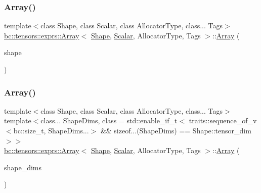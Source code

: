 \mbox{\label{structbc_1_1tensors_1_1exprs_1_1Array_a5fa294dbb5d9eccea7201c507c6f7004}} 
\subsubsection{\texorpdfstring{Array()}{Array()}\hspace{0.1cm}{\footnotesize\ttfamily [6/9]}}
{\footnotesize\ttfamily template$<$class Shape, class Scalar, class Allocator\+Type, class... Tags$>$ \\
\hyperlink{structbc_1_1tensors_1_1exprs_1_1Array}{bc\+::tensors\+::exprs\+::\+Array}$<$ \hyperlink{structbc_1_1Shape}{Shape}, \hyperlink{namespacebc_aa12ac55ee2c43dc082894dd3859daee1}{Scalar}, Allocator\+Type, Tags $>$\+::\hyperlink{structbc_1_1tensors_1_1exprs_1_1Array}{Array} (\begin{DoxyParamCaption}\item[{\hyperlink{structbc_1_1tensors_1_1exprs_1_1Array_a67c96ea64a2899ba0593a6b81aa0868e}{shape\+\_\+type}}]{shape }\end{DoxyParamCaption})\hspace{0.3cm}{\ttfamily [inline]}}

\mbox{\label{structbc_1_1tensors_1_1exprs_1_1Array_a0bdfc60f9711f7334ed0850fd417109c}} 
\subsubsection{\texorpdfstring{Array()}{Array()}\hspace{0.1cm}{\footnotesize\ttfamily [7/9]}}
{\footnotesize\ttfamily template$<$class Shape, class Scalar, class Allocator\+Type, class... Tags$>$ \\
template$<$class... Shape\+Dims, class  = std\+::enable\+\_\+if\+\_\+t$<$			traits\+::sequence\+\_\+of\+\_\+v$<$bc\+::size\+\_\+t, Shape\+Dims...$>$ \&\&			sizeof...(\+Shape\+Dims) == Shape\+::tensor\+\_\+dim$>$$>$ \\
\hyperlink{structbc_1_1tensors_1_1exprs_1_1Array}{bc\+::tensors\+::exprs\+::\+Array}$<$ \hyperlink{structbc_1_1Shape}{Shape}, \hyperlink{namespacebc_aa12ac55ee2c43dc082894dd3859daee1}{Scalar}, Allocator\+Type, Tags $>$\+::\hyperlink{structbc_1_1tensors_1_1exprs_1_1Array}{Array} (\begin{DoxyParamCaption}\item[{const Shape\+Dims \&...}]{shape\+\_\+dims }\end{DoxyParamCaption})\hspace{0.3cm}{\ttfamily [inline]}}

